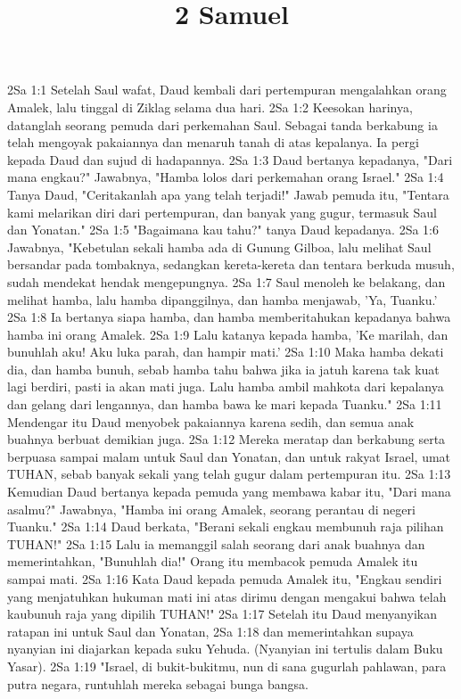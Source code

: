 

\title{2 Samuel}

2Sa 1:1  Setelah Saul wafat, Daud kembali dari pertempuran mengalahkan orang Amalek, lalu tinggal di Ziklag selama dua hari.
2Sa 1:2  Keesokan harinya, datanglah seorang pemuda dari perkemahan Saul. Sebagai tanda berkabung ia telah mengoyak pakaiannya dan menaruh tanah di atas kepalanya. Ia pergi kepada Daud dan sujud di hadapannya.
2Sa 1:3  Daud bertanya kepadanya, "Dari mana engkau?" Jawabnya, "Hamba lolos dari perkemahan orang Israel."
2Sa 1:4  Tanya Daud, "Ceritakanlah apa yang telah terjadi!" Jawab pemuda itu, "Tentara kami melarikan diri dari pertempuran, dan banyak yang gugur, termasuk Saul dan Yonatan."
2Sa 1:5  "Bagaimana kau tahu?" tanya Daud kepadanya.
2Sa 1:6  Jawabnya, "Kebetulan sekali hamba ada di Gunung Gilboa, lalu melihat Saul bersandar pada tombaknya, sedangkan kereta-kereta dan tentara berkuda musuh, sudah mendekat hendak mengepungnya.
2Sa 1:7  Saul menoleh ke belakang, dan melihat hamba, lalu hamba dipanggilnya, dan hamba menjawab, 'Ya, Tuanku.'
2Sa 1:8  Ia bertanya siapa hamba, dan hamba memberitahukan kepadanya bahwa hamba ini orang Amalek.
2Sa 1:9  Lalu katanya kepada hamba, 'Ke marilah, dan bunuhlah aku! Aku luka parah, dan hampir mati.'
2Sa 1:10  Maka hamba dekati dia, dan hamba bunuh, sebab hamba tahu bahwa jika ia jatuh karena tak kuat lagi berdiri, pasti ia akan mati juga. Lalu hamba ambil mahkota dari kepalanya dan gelang dari lengannya, dan hamba bawa ke mari kepada Tuanku."
2Sa 1:11  Mendengar itu Daud menyobek pakaiannya karena sedih, dan semua anak buahnya berbuat demikian juga.
2Sa 1:12  Mereka meratap dan berkabung serta berpuasa sampai malam untuk Saul dan Yonatan, dan untuk rakyat Israel, umat TUHAN, sebab banyak sekali yang telah gugur dalam pertempuran itu.
2Sa 1:13  Kemudian Daud bertanya kepada pemuda yang membawa kabar itu, "Dari mana asalmu?" Jawabnya, "Hamba ini orang Amalek, seorang perantau di negeri Tuanku."
2Sa 1:14  Daud berkata, "Berani sekali engkau membunuh raja pilihan TUHAN!"
2Sa 1:15  Lalu ia memanggil salah seorang dari anak buahnya dan memerintahkan, "Bunuhlah dia!" Orang itu membacok pemuda Amalek itu sampai mati.
2Sa 1:16  Kata Daud kepada pemuda Amalek itu, "Engkau sendiri yang menjatuhkan hukuman mati ini atas dirimu dengan mengakui bahwa telah kaubunuh raja yang dipilih TUHAN!"
2Sa 1:17  Setelah itu Daud menyanyikan ratapan ini untuk Saul dan Yonatan,
2Sa 1:18  dan memerintahkan supaya nyanyian ini diajarkan kepada suku Yehuda. (Nyanyian ini tertulis dalam Buku Yasar).
2Sa 1:19  "Israel, di bukit-bukitmu, nun di sana gugurlah pahlawan, para putra negara, runtuhlah mereka sebagai bunga bangsa.
